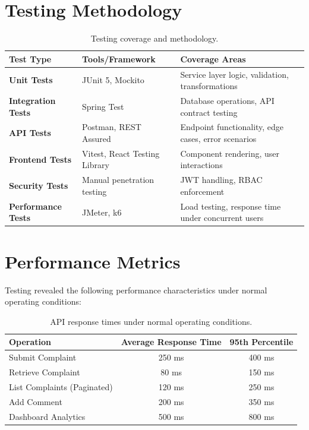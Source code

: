 \documentclass[12pt,a4paper]{report}
\begin{document}
\section{Testing Methodology}

\begin{table}[H]
\centering
\caption{Testing coverage and methodology.}
\label{tab:testing}
\small
\begin{tabular}{p{3cm} p{3.5cm} p{7.5cm}}
\toprule
\textbf{Test Type} & \textbf{Tools/Framework} & \textbf{Coverage Areas} \\
\midrule
\textbf{Unit Tests} & JUnit 5, Mockito & Service layer logic, validation, transformations \\
\midrule
\textbf{Integration Tests} & Spring Test & Database operations, API contract testing \\
\midrule
\textbf{API Tests} & Postman, REST Assured & Endpoint functionality, edge cases, error scenarios \\
\midrule
\textbf{Frontend Tests} & Vitest, React Testing Library & Component rendering, user interactions \\
\midrule
\textbf{Security Tests} & Manual penetration testing & JWT handling, RBAC enforcement \\
\midrule
\textbf{Performance Tests} & JMeter, k6 & Load testing, response time under concurrent users \\
\bottomrule
\end{tabular}
\end{table}

\section{Performance Metrics}
Testing revealed the following performance characteristics under normal operating conditions:

\begin{table}[H]
\centering
\caption{API response times under normal operating conditions.}
\label{tab:performance}
\small
\begin{tabular}{l c c}
\toprule
\textbf{Operation} & \textbf{Average Response Time} & \textbf{95th Percentile} \\
\midrule
Submit Complaint & 250 ms & 400 ms \\
Retrieve Complaint & 80 ms & 150 ms \\
List Complaints (Paginated) & 120 ms & 250 ms \\
Add Comment & 200 ms & 350 ms \\
Dashboard Analytics & 500 ms & 800 ms \\
\bottomrule
\end{tabular}
\end{table}
\end{document}
